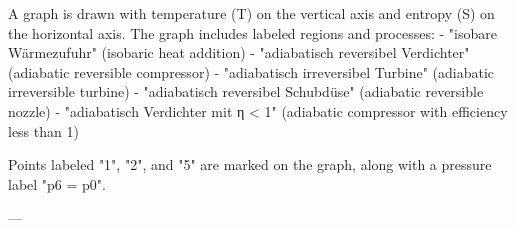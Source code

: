 A graph is drawn with temperature (T) on the vertical axis and entropy (S) on the horizontal axis. The graph includes labeled regions and processes:  
- "isobare Wärmezufuhr" (isobaric heat addition)  
- "adiabatisch reversibel Verdichter" (adiabatic reversible compressor)  
- "adiabatisch irreversibel Turbine" (adiabatic irreversible turbine)  
- "adiabatisch reversibel Schubdüse" (adiabatic reversible nozzle)  
- "adiabatisch Verdichter mit η < 1" (adiabatic compressor with efficiency less than 1)  

Points labeled "1", "2", and "5" are marked on the graph, along with a pressure label "p6 = p0".  

---